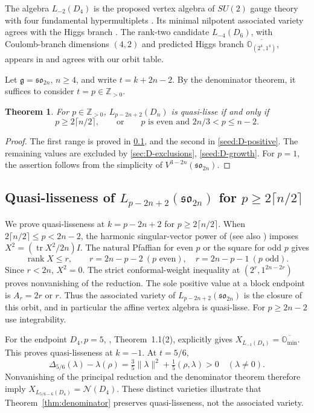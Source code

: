 \documentclass[11pt,a4paper]{amsart}
\numberwithin{equation}{section}
\newtheorem{theorem}{Theorem}[section]
\theoremstyle{definition}
\theoremstyle{remark}
\newcommand{\Z}{\mathbb Z}
\newcommand{\g}{\mathfrak g}
\newcommand{\N}{\mathcal N}
\newcommand{\OO}{\mathbb O}
\newcommand{\sog}{\mathfrak{so}}
\newcommand{\tr}{\operatorname{tr}}
\newcommand{\rank}{\operatorname{rank}}
\begin{document}
The algebra $L_{-2}(D_4)$ is the proposed vertex algebra of $SU(2)$
gauge theory with four fundamental hypermultiplets
\cite[Section~5.1.3]{BeemEtAl2015}. Its minimal nilpotent associated
variety agrees with the Higgs branch \cite[Section~4]{BeemRastelli2018}.
The rank-two candidate $L_{-4}(D_6)$, with Coulomb-branch dimensions
$(4,2)$ and predicted Higgs branch $\overline{\OO_{(2^4,1^4)}}$,
appears in \cite[Table~5]{LiXieYan2023} and agrees with our orbit table.

Let $\g=\sog_{2n}$, $n\ge4$, and write $t=k+2n-2$.
By the denominator theorem, it suffices to consider $t=p\in\Z_{>0}$.

\begin{theorem}\label{thm:D-integer-classification}
For $p\in\Z_{>0}$, $L_{p-2n+2}(D_n)$ is quasi-lisse if and only if
$$
 p\ge2\lceil n/2\rceil,
 \qquad\text{or}\qquad
 p\text{ is even and }2n/3<p\le n-2.
$$
\end{theorem}
\begin{proof}
The first range is proved in \cref{sec:D-upper}, and the second in
\cref{seed:D-positive}. The remaining values are excluded by
\cref{sec:D-exclusions}, \cref{seed:D-growth}. For $p=1$, the assertion follows from the simplicity of
$V^{3-2n}(\sog_{2n})$.
\end{proof}

\subsection{\texorpdfstring{Quasi-lisseness of $L_{p-2n+2}(\sog_{2n})$ for $p\ge2\lceil n/2\rceil$}{Quasi-lisseness of L(p-2n+2)(so(2n)) for p at least 2ceil(n/2)}}\label{sec:D-upper}

We prove quasi-lisseness at $k=p-2n+2$ for
$p\ge2\lceil n/2\rceil$. When $2\lceil n/2\rceil\le p<2n-2$, the
harmonic singular-vector power of \cite[Theorem~3.1]{PerseD2013}
(see also \cite[Lemma~4.1 and Theorem~4.2]{ArakawaMoreau2018}) imposes $X^2=(\tr X^2/2n)I$. The natural Pfaffian for
even $p$ or the square for odd $p$ gives
$$
 \rank X\le r,\qquad
 r=2n-p-2\ (p\text{ even}),\quad r=2n-p-1\ (p\text{ odd}).
$$
Since $r<2n$, $X^2=0$. The strict conformal-weight inequality at $(2^r,1^{2n-2r})$ proves
nonvanishing of the reduction. The sole positive value at a block
endpoint is $A_r=2r$ or $r$. Thus the associated variety of $L_{p-2n+2}(\sog_{2n})$ is the closure of this orbit,
and in particular the affine vertex algebra is quasi-lisse. For $p\ge2n-2$ use
integrability.

For the endpoint $D_4,p=5$, \cite{ArakawaMoreau2018}, Theorem~1.1(2),
explicitly gives $X_{L_{-1}(D_4)}=\overline{\OO_{\min}}$. This proves
quasi-lisseness at $k=-1$. At $t=5/6$,
$$
 \Delta_{5/6}(\lambda)-\lambda(\rho)
 =\tfrac35\|\lambda\|^2+\tfrac15(\rho,\lambda)>0
 \quad(\lambda\ne0).
$$
Nonvanishing of the principal reduction and the denominator theorem therefore imply
$X_{L_{5/6-6}(D_4)}=\N(D_4)$. These distinct varieties illustrate that Theorem~\ref{thm:denominator} preserves quasi-lisseness,
not the associated variety.
\end{document}
